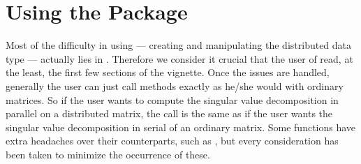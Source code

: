 \section[]{Using the  Package}

Most of the difficulty in using  --- creating and manipulating the distributed data type --- actually lies in .  Therefore we consider it crucial that the user of  read, at the least, the first few sections of the  vignette.  Once the  issues are handled, generally the user can just call  methods exactly as he/she would with ordinary  matrices.  So if the user wants to compute the singular value decomposition in parallel on a distributed matrix, the call is the same as if the user wants the singular value decomposition in serial of an ordinary  matrix.  Some functions have extra headaches over their  counterparts, such as , but every consideration has been taken to minimize the occurrence of these.
